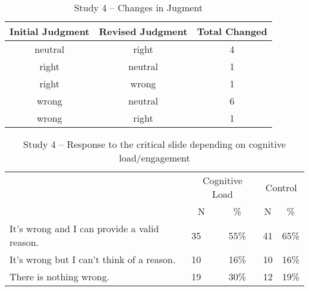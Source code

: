 \documentclass[
  american,
  man,floatsintext]{apa7}
\begin{document}
\begin{table}[tbp]

\begin{center}
\begin{threeparttable}

\caption{\label{tab:tabS4change}Study 4 – Changes in Jugment}

\begin{tabular}{ccc}
\toprule
Initial Judgment & \multicolumn{1}{c}{Revised Judgment} & \multicolumn{1}{c}{Total Changed}\\
\midrule
neutral & right & 4\\
right & neutral & 1\\
right & wrong & 1\\
wrong & neutral & 6\\
wrong & right & 1\\
\bottomrule
\end{tabular}

\end{threeparttable}
\end{center}

\end{table}

\begin{table}[tbp]

\begin{center}
\begin{threeparttable}

\caption{\label{tab:tabS4tab1dumb1all}Study 4 – Response to the critical slide depending on cognitive load/engagement}

\begin{tabular}{llccc}
\toprule
 & \multicolumn{2}{c}{Cognitive Load} & \multicolumn{2}{c}{Control} \\
\cmidrule(r){2-3} \cmidrule(r){4-5}
 & \multicolumn{1}{c}{N} & \multicolumn{1}{c}{\%} & \multicolumn{1}{c}{N} & \multicolumn{1}{c}{\%}\\
\midrule
It's wrong and I can provide a valid reason. & 35 & 55\% & 41 & 65\%\\
It's wrong but I can't think of a reason. & 10 & 16\% & 10 & 16\%\\
There is nothing wrong. & 19 & 30\% & 12 & 19\%\\
\bottomrule
\end{tabular}

\end{threeparttable}
\end{center}

\end{table}
\end{document}
